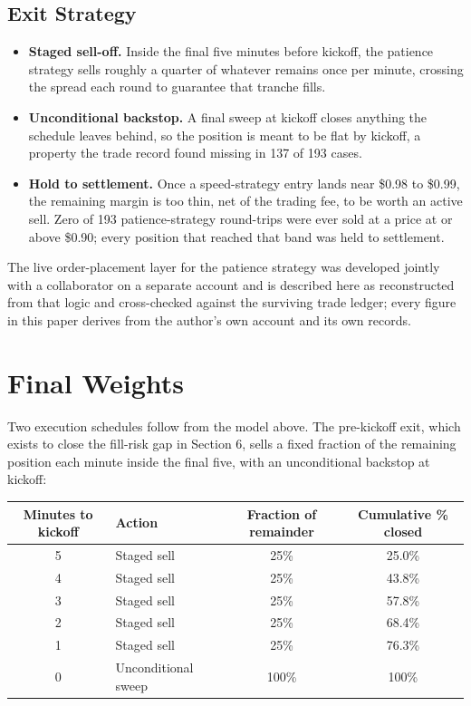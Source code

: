 \documentclass[12pt]{article}
\begin{document}
\subsection{Exit Strategy}
\begin{itemize}
\item \textbf{Staged sell-off.} Inside the final five minutes before kickoff, the
patience strategy sells roughly a quarter of whatever remains once per minute,
crossing the spread each round to guarantee that tranche fills.
\item \textbf{Unconditional backstop.} A final sweep at kickoff closes anything
the schedule leaves behind, so the position is meant to be flat by kickoff, a
property the trade record found missing in 137 of 193 cases.
\item \textbf{Hold to settlement.} Once a speed-strategy entry lands near \$0.98
to \$0.99, the remaining margin is too thin, net of the trading fee, to be worth
an active sell. Zero of 193 patience-strategy round-trips were ever sold at a
price at or above \$0.90; every position that reached that band was held to
settlement.
\end{itemize}

The live order-placement layer for the patience strategy was developed jointly
with a collaborator on a separate account and is described here as reconstructed
from that logic and cross-checked against the surviving trade ledger; every
figure in this paper derives from the author's own account and its own records.

\section{Final Weights}

Two execution schedules follow from the model above. The pre-kickoff exit, which
exists to close the fill-risk gap in Section 6, sells a fixed fraction of the
remaining position each minute inside the final five, with an unconditional
backstop at kickoff:

\begin{center}
\begin{tabular}{@{}c l c c@{}}
\toprule
Minutes to kickoff & Action & Fraction of remainder & Cumulative \% closed \\
\midrule
5 & Staged sell        & 25\%  & 25.0\% \\
4 & Staged sell        & 25\%  & 43.8\% \\
3 & Staged sell        & 25\%  & 57.8\% \\
2 & Staged sell        & 25\%  & 68.4\% \\
1 & Staged sell        & 25\%  & 76.3\% \\
0 & Unconditional sweep & 100\% & 100\%  \\
\bottomrule
\end{tabular}
\end{center}
\end{document}
